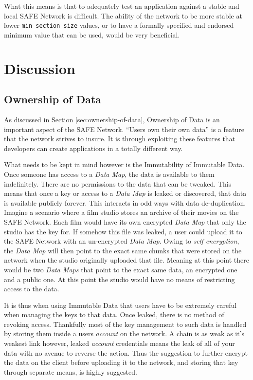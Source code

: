 What this means is that to adequately test an application against a stable and local SAFE Network is difficult. The ability of the network to be more stable at lower \texttt{min\_section\_size} values, or to have a formally specified and endorsed minimum value that can be used, would be very beneficial.

\section{Discussion}

\subsection{Ownership of Data}

As discussed in Section \ref{sec:ownership-of-data}, Ownership of Data is an important aspect of the SAFE Network. ``Users own their own data'' is a feature that the network strives to insure. It is through exploiting these features that developers can create applications in a totally different way.

What needs to be kept in mind however is the Immutability of Immutable Data. Once someone has access to a \textit{Data Map}, the data is available to them indefinitely. There are no permissions to the data that can be tweaked. This means that once a key or access to a \textit{Data Map} is leaked or discovered, that data is available publicly forever. This interacts in odd ways with data de-duplication. Imagine a scenario where a film studio stores an archive of their movies on the SAFE Network. Each film would have its own encrypted \textit{Data Map} that only the studio has the key for. If somehow this file was leaked, a user could upload it to the SAFE Network with an un-encrypted \textit{Data Map}. Owing to \textit{self encryption}, the \textit{Data Map} will then point to the exact same chunks that were stored on the network when the studio originally uploaded that file. Meaning at this point there would be two \textit{Data Maps} that point to the exact same data, an encrypted one and a public one. At this point the studio would have no means of restricting access to the data.

It is thus when using Immutable Data that users have to be extremely careful when managing the keys to that data. Once leaked, there is no method of revoking access. Thankfully most of the key management to such data is handled by storing them inside a users \textit{account} on the network. A chain is as weak as it's weakest link however, leaked \textit{account} credentials means the leak of all of your data with no avenue to reverse the action. Thus the suggestion to further encrypt the data on the client before uploading it to the network, and storing that key through separate means, is highly suggested.

